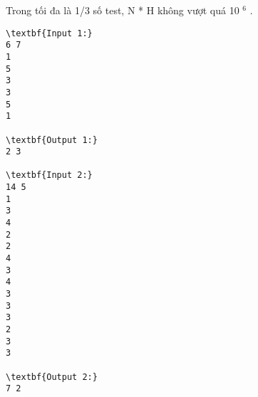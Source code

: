 Trong tối đa là 1/3 số test, N * H không vượt quá 10 $^ 6 $ .
\begin{verbatim}
\textbf{Input 1:}
6 7
1
5
3
3
5
1

\textbf{Output 1:}
2 3 

\textbf{Input 2:}
14 5
1
3
4
2
2
4
3
4
3
3
3
2
3
3

\textbf{Output 2:}
7 2\end{verbatim}